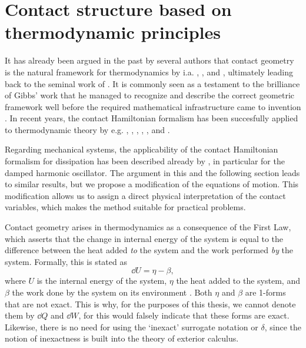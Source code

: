 \section{Contact structure based on thermodynamic principles}
\label{sec:thermodynamics}
It has already been argued in the past by several authors that contact geometry is the natural framework for thermodynamics by i.a. \citet{Arnold1991,Arnold1989a,Arnold1989,Arnold1989b}, \citet{Bamberg1988}, \citet{Burke1985} and \citet{Hermann1973}, ultimately leading back to the seminal work of \citet{Gibbs1873}. It is commonly seen as a testament to the brilliance of Gibbs' work that he managed to recognize and describe the correct geometric framework well before the required mathematical infrastructure came to invention \cite{Wightman1979}. In recent years, the contact Hamiltonian formalism has been succesfully applied to thermodynamic theory by e.g. \citet{Mrugala1991,Mrugala2000,Mrugala1984,Mrugala1985,Mrugala1993,Mrugala1996}, \citet{Balian2001}, \citet{VanderSchaft2021a,VanderSchaft2018}, \citet{Maschke2018}, \citet{Bravetti2015}, and \citet{Simoes2020}. 

Regarding mechanical systems, the applicability of the contact Hamiltonian formalism for dissipation has been described already by \citet{Bravetti2017}, in particular for the damped harmonic oscillator. The argument in this and the following section leads to similar results, but we propose a modification of the equations of motion. This modification allows us to assign a direct physical interpretation of the contact variables, which makes the method suitable for practical problems.

Contact geometry arises in thermodynamics as a consequence of the First Law, which asserts that the change in internal energy of the system is equal to the difference between the heat added \emph{to} the system and the work performed \emph{by} the system. Formally, this is stated as
\begin{equation}
    \dd{U} = \eta - \beta,
    \label{eq:thermo_first_law}
\end{equation}
where $U$ is the internal energy of the system, $\eta$ the heat added to the system, and $\beta$ the work done by the system on its environment \cite{Bamberg1988,Frankel2012}. Both $\eta$ and $\beta$ are 1-forms that are not exact. This is why, for the purposes of this thesis, we cannot denote them by $\dd{Q}$ and  $\dd{W}$, for this would falsely indicate that these forms are exact. Likewise, there is no need for using the `inexact' surrogate notation \dj\xspace or $\delta$, since the notion of inexactness is built into the theory of exterior calculus. 

